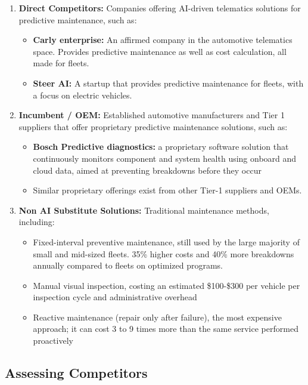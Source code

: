 \documentclass[11pt,a4paper]{article}
\begin{document}
\begin{enumerate}
    \item \textbf{Direct Competitors:} Companies offering AI-driven telematics solutions for predictive maintenance, such as:
          \begin{itemize}
            \item \textbf{Carly enterprise:} An affirmed company in the automotive telematics space. Provides predictive maintenance as well as cost calculation, all made for fleets.
            \item \textbf{Steer AI:} A startup that provides predictive maintenance for fleets, with a focus on electric vehicles.
          \end{itemize}
    \item \textbf{Incumbent / OEM:} Established automotive manufacturers and Tier 1 suppliers that offer proprietary predictive maintenance solutions, such as:
            \begin{itemize}
                \item \textbf{Bosch Predictive diagnostics:} a proprietary software solution that continuously monitors component and system health using onboard and cloud data, aimed at preventing breakdowns before they occur
                \item Similar proprietary offerings exist from other Tier-1 suppliers and OEMs.
            \end{itemize}
    \item \textbf{Non AI Substitute Solutions:} Traditional maintenance methods, including:
            \begin{itemize}
                \item Fixed-interval preventive maintenance, still used by the large majority of small and mid-sized fleets. 35\% higher costs and 40\% more breakdowns annually compared to fleets on optimized programs.
                \item Manual visual inspection, costing an estimated \$100-\$300 per vehicle per inspection cycle  and administrative overhead 
                \item Reactive maintenance (repair only after failure),  the most expensive approach; it can cost 3 to 9 times more than the same service performed proactively
            \end{itemize}
\end{enumerate}



\subsection{Assessing Competitors}
\end{document}
